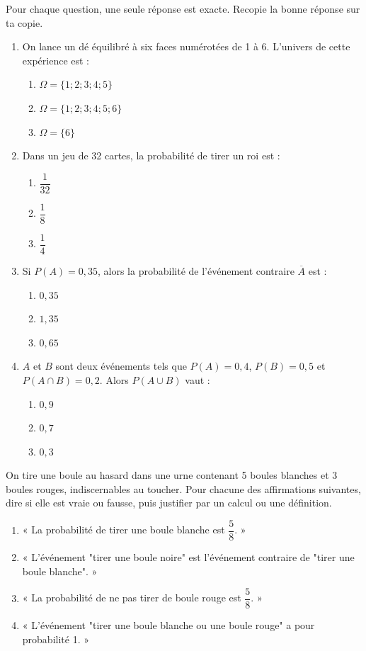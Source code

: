 \documentclass[11pt]{article}
\begin{document}
\begin{exercice}
Pour chaque question, une seule réponse est exacte. Recopie la bonne réponse sur ta copie.
\begin{enumerate}
\item On lance un dé équilibré à six faces numérotées de 1 à 6. L'univers de cette expérience est :
\begin{enumerate}
\item $\Omega = \{1 ; 2 ; 3 ; 4 ; 5\}$
\item $\Omega = \{1 ; 2 ; 3 ; 4 ; 5 ; 6\}$
\item $\Omega = \{6\}$
\end{enumerate}
\item Dans un jeu de 32 cartes, la probabilité de tirer un roi est :
\begin{enumerate}
\item $\dfrac{1}{32}$
\item $\dfrac{1}{8}$
\item $\dfrac{1}{4}$
\end{enumerate}
\item Si $P(A) = 0{,}35$, alors la probabilité de l'événement contraire $\overline{A}$ est :
\begin{enumerate}
\item $0{,}35$
\item $1{,}35$
\item $0{,}65$
\end{enumerate}
\item $A$ et $B$ sont deux événements tels que $P(A) = 0{,}4$, $P(B) = 0{,}5$ et $P(A \cap B) = 0{,}2$. Alors $P(A \cup B)$ vaut :
\begin{enumerate}
\item $0{,}9$
\item $0{,}7$
\item $0{,}3$
\end{enumerate}
\end{enumerate}
\end{exercice}

\begin{exercice}
On tire une boule au hasard dans une urne contenant 5 boules blanches et 3 boules rouges, indiscernables au toucher. Pour chacune des affirmations suivantes, dire si elle est vraie ou fausse, puis justifier par un calcul ou une définition.
\begin{enumerate}
\item « La probabilité de tirer une boule blanche est $\dfrac{5}{8}$. »
\item « L'événement "tirer une boule noire" est l'événement contraire de "tirer une boule blanche". »
\item « La probabilité de ne pas tirer de boule rouge est $\dfrac{5}{8}$. »
\item « L'événement "tirer une boule blanche ou une boule rouge" a pour probabilité 1. »
\end{enumerate}
\end{exercice}
\end{document}
